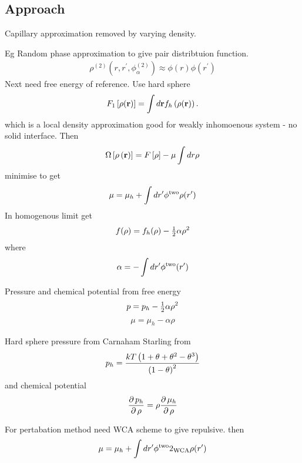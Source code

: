 \subsection{Approach}
Capillary approximation removed by varying density.

Eg Random phase approximation to give pair distribtuion function\cite{Ruckensteirn2005}.
\begin{align}
\rho^{(2)} (r, r^\prime, \phi_\alpha^{(2)}) \approx \phi(r) \phi(r^\prime)
\end{align}
Next need free energy of reference.
Use hard sphere\cite{Ruckensteirn2005}
\begin{align}
F_1\left[ \rho(\textbf{r}) \right] = \int d\textbf{r} f_h \left( \rho(\textbf{r}) \right).
\end{align}
which is a local density approximation good for weakly inhomoenous system - no solid interface\cite{Ruckensteirn2005}.
Then 
\begin{align}
  \Omega\left[ \rho\left( \textbf{r} \right) \right] = F\left[ \rho \right] - \mu \int dr \rho
\end{align}
minimise to get\cite{Ruckensteirn2005}
\begin{align}
  \mu = \mu_h + \int dr^\prime \phi^{\text{two}} \rho(r^\prime)
\end{align}
In homogenous limit get \cite{Ruckensteirn2005}
\begin{align}
  f(\rho) = f_h(\rho) - \tfrac{1}{2} \alpha \rho^2
\end{align}
where \cite{Ruckensteirn2005}
\begin{align}
  \alpha = -\int dr^\prime \phi^{\text{two}}(r^\prime)
\end{align}

Pressure and chemical potential from free energy\cite{Ruckensteirn2005}
\begin{align}
  p = p_h - \tfrac{1}{2} \alpha \rho^2
\end{align}
\begin{align}
  \mu = \mu_h - \alpha \rho
\end{align}

Hard sphere pressure from Carnaham Starling from\cite{Ruckensteirn2005}
\begin{align}
  p_h = \frac{kT\left( 1 + \theta + \theta^2 - \theta^3 \right)}{\left( 1 - \theta \right)^2}
\end{align}
and chemical potential \cite{Ruckensteirn2005}
\begin{align}
  \frac{\operatorname{\partial} p_h}{\operatorname{\partial} \rho} = \rho \frac{\operatorname{\partial} \mu_h}{\operatorname{\partial} \rho}
\end{align}

For pertabation method need  WCA scheme\cite{Ruckensteirn2005}
to give repulsive.
then
\begin{align}
  \mu = \mu_h + \int dr^\prime \phi^{\text{two}}2_{\text{WCA}} \rho(r^\prime)
\end{align}

